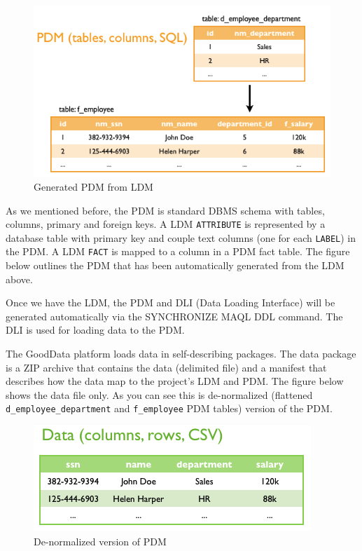 \documentclass[a4paper, 12pt, titlepage, fleqn]{article}
\begin{document}
\begin{figure}[htb]
\centering
\includegraphics[scale=0.6]{images/pdm-model.png}
\caption{Generated PDM from LDM}
\label{fig:pdm}
\end{figure}

As we mentioned before, the PDM is standard DBMS schema with tables, columns, primary and foreign keys. A LDM \verb=ATTRIBUTE= is represented by a database table with primary key and couple text columns (one for each \verb=LABEL=) in the PDM. A LDM \verb=FACT= is mapped to a column in a PDM fact table. The figure below outlines the PDM that has been automatically generated from the LDM above.

Once we have the LDM, the PDM and DLI (Data Loading Interface) will be generated automatically via the SYNCHRONIZE MAQL DDL command. 
The DLI is used for loading data to the PDM.

The GoodData platform loads data in self-describing packages. The data package is a ZIP archive that contains the data (delimited file) and a manifest that describes how the data map to the project's LDM and PDM. The figure below shows the data file only. As you can see this is de-normalized (flattened \verb=d_employee_department= and \verb=f_employee= PDM tables) version of the PDM.

\begin{figure}[htb]
\centering
\includegraphics[scale=0.6]{images/data-template.png}
\caption{De-normalized version of PDM}
\label{fig:pdm}
\end{figure}
\end{document}
